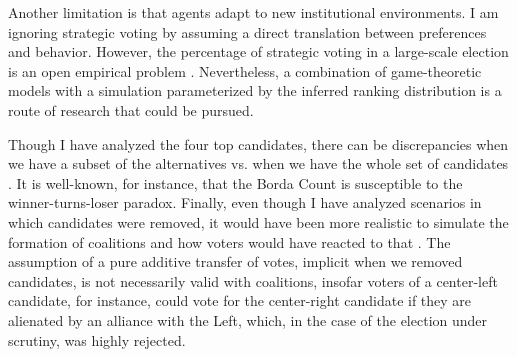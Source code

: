 \documentclass[hidelinks,11pt]{article} \usepackage[utf8]{inputenc}
\begin{document}
Another limitation is that agents adapt to new institutional environments. I am
ignoring strategic voting by assuming a direct translation between preferences
and behavior. However, the percentage of strategic voting in a large-scale
election is an open empirical problem
\parencite{straeten10_strat_sincer_heuris_votin_under,kawai2013inferring}.
Nevertheless, a combination of game-theoretic models with a simulation
parameterized by the inferred ranking distribution is a route of research that
could be pursued.

Though I have analyzed the four top candidates, there can be discrepancies when
we have a subset of the alternatives vs. when we have the whole set of
candidates \parencite{saari2001chaotic, kaminski2015empirical}. It is
well-known, for instance, that the Borda Count is susceptible to the
winner-turns-loser paradox. Finally, even though I have analyzed scenarios in
which candidates were removed, it would have been more realistic to simulate the
formation of coalitions and how voters would have reacted to that \parencite{kaminski1998revival}. The assumption of a pure additive transfer of votes,
implicit when we removed candidates, is not necessarily valid with coalitions,
insofar voters of a center-left candidate, for instance, could vote for the
center-right candidate if they are alienated by an alliance with the Left,
which, in the case of the election under scrutiny, was highly rejected.
\printbibliography
\end{document}
